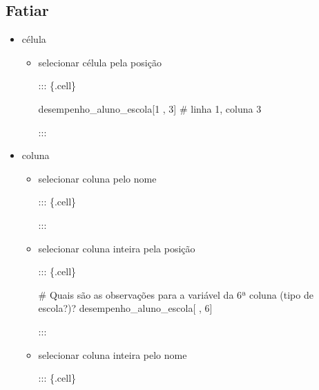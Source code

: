 \documentclass[
  letterpaper,
  DIV=11,
  numbers=noendperiod]{scrreprt}
\newenvironment{Shaded}{\begin{snugshade}}{\end{snugshade}}
\newcommand{\CommentTok}[1]{\textcolor[rgb]{0.37,0.37,0.37}{#1}}
\newcommand{\DecValTok}[1]{\textcolor[rgb]{0.68,0.00,0.00}{#1}}
\newcommand{\NormalTok}[1]{\textcolor[rgb]{0.00,0.23,0.31}{#1}}
\newcommand{\SpecialCharTok}[1]{\textcolor[rgb]{0.37,0.37,0.37}{#1}}
\providecommand{\tightlist}{%
  \setlength{\itemsep}{0pt}\setlength{\parskip}{0pt}}\usepackage{longtable,booktabs,array}
\begin{document}
\hypertarget{fatiar}{%
\subsection{Fatiar}\label{fatiar}}

\begin{itemize}
\tightlist
\item
  célula

  \begin{itemize}
  \item
    selecionar célula pela posição

    ::: \{.cell\}

\begin{Shaded}
\begin{Highlighting}[]
\NormalTok{desempenho\_aluno\_escola[}\DecValTok{1}\NormalTok{ , }\DecValTok{3}\NormalTok{] }\CommentTok{\# linha 1, coluna 3}
\end{Highlighting}
\end{Shaded}

    :::
  \end{itemize}
\item
  coluna

  \begin{itemize}
  \item
    selecionar coluna pelo nome

    ::: \{.cell\}

\begin{Shaded}
\end{Shaded}

    :::
  \item
    selecionar coluna inteira pela posição

    ::: \{.cell\}

\begin{Shaded}
\begin{Highlighting}[]
    \CommentTok{\# Quais são as observações para a variável da 6ª coluna (tipo de escola?)? }
\NormalTok{    desempenho\_aluno\_escola[ , }\DecValTok{6}\NormalTok{]}
\end{Highlighting}
\end{Shaded}

    :::
  \item
    selecionar coluna inteira pelo nome

    ::: \{.cell\}


\end{itemize}
\end{itemize}
\end{document}
